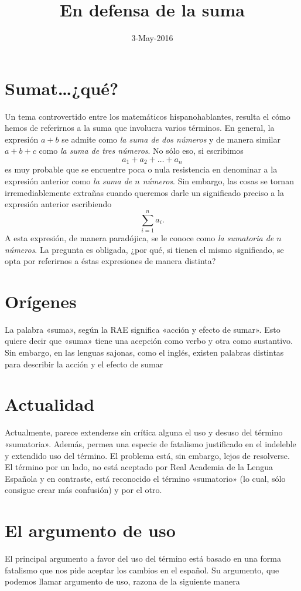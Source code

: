 \documentclass[draft,letter,10pt,notitlepage]{article}
\title{En defensa de la suma}
\date{3-May-2016}
\theoremstyle{definition}
\theoremstyle{remark}
\begin{document}
\maketitle
\section{Sumat\dots ¿qué?}
Un tema controvertido entre los matemáticos hispanohablantes, 
resulta el cómo hemos de referirnos a la suma que involucra varios términos.
En general, la expresión \( a + b\) se admite como \emph{la suma de dos números}
y de manera similar  \( a + b + c\) como \emph{la suma de tres números}. 
No sólo eso, si escribimos
\[ a_1 + a_2 + \dots + a_n\]
es muy probable que se encuentre poca o nula resistencia en
denominar a la expresión anterior como \emph{la suma de \( n\) números}.
Sin embargo, las cosas se tornan irremediablemente extrañas cuando 
queremos darle un significado preciso a la expresión anterior escribiendo
\[ \sum_{i=1}^n a_i.\]
A esta expresión, de manera paradójica, se le conoce como
\emph{la sumatoria de \( n\) números}. La pregunta es obligada, ¿por qué, si
tienen el mismo significado, se opta por referirnos a éstas expresiones de 
manera distinta?

\section{Orígenes}

La palabra «suma», según la RAE significa «acción y efecto de
sumar». Esto quiere decir que «suma» tiene una acepción como verbo y
otra como sustantivo. Sin embargo, en las lenguas sajonas, como el
inglés, existen palabras distintas para describir la acción y el
efecto de sumar

\section{Actualidad}
Actualmente, parece extenderse sin crítica alguna el uso y desuso del
término «sumatoria». Además, permea una especie de fatalismo justificado
en el indeleble y extendido uso del término. El problema está,
sin embargo, lejos de resolverse. El término por un lado, no está
aceptado por Real Academia de la Lengua Española y en contraste,
está reconocido el término «sumatorio» (lo cual, sólo consigue crear
más confusión) y por el otro.

\section{El argumento de uso}
El principal argumento a favor del uso del término está basado en
una forma fatalismo que nos pide aceptar los cambios en el español. Su
argumento, que podemos llamar argumento de uso, razona de la siguiente
manera
\end{document}
